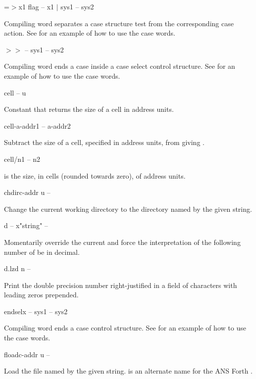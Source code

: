\begin{cgloss}{=$>$}{x1 flag -- x1 $|$ }{sys1 -- sys2}

Compiling word separates a case structure test from the corresponding case
action.  See  for an example of how to use the case words.
\end{cgloss}
\begin{cgloss}{$>>$}{ -- }{sys1 -- sys2}

Compiling word ends a case inside a case select control structure.  See
 for an example of how to use the case words.
\end{cgloss}
\begin{gloss}{cell}{ -- u}

Constant that returns the size of a cell in address units.
\end{gloss}
\begin{gloss}{cell-}{a-addr1 -- a-addr2}

Subtract the size of a cell, specified in address units, from
 giving .
\end{gloss}
\begin{gloss}{cell/}{n1 -- n2}

 is the size, in cells (rounded towards zero), of
 address units.
\end{gloss}
\begin{gloss}{chdir}{c-addr u -- }

Change the current working directory to the directory named by the given
string.
\end{gloss}
\begin{cgloss}{d }{ -- x}{"string" -- }

Momentarily override the current  and force the interpretation
of the following number of be in decimal.
\end{cgloss}
\begin{gloss}{d.lz}{d n -- }

Print the double precision number  right-justified in a field of
 characters with leading zeros prepended.
\end{gloss}
\begin{cgloss}{endsel}{x -- }{sys1 -- sys2}

Compiling word ends a case control structure.  See  for an example
of how to use the case words.
\end{cgloss}
\begin{gloss}{fload}{c-addr u -- }

Load the file named by the given string.   is an alternate
name for the ANS Forth .
\end{gloss}
